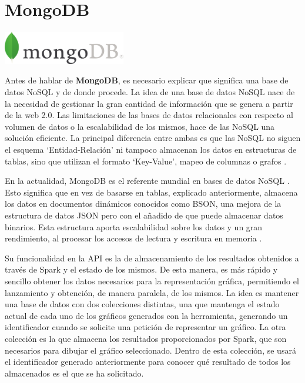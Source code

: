 \section{MongoDB}
\begin{minipage}{\textwidth}
	\centering
	\includegraphics[width=0.4\textwidth]{imagenes/mongoDB_logo.png}\\[0.1cm]
\end{minipage}

Antes de hablar de \textbf{MongoDB}, es necesario explicar que significa una base de datos NoSQL y de donde procede. La idea de una base de datos NoSQL nace de la necesidad de gestionar la gran cantidad de información que se genera a partir de la web 2.0. Las limitaciones de las bases de datos relacionales con respecto al volumen de datos o la escalabilidad de los mismos, hace de las NoSQL una solución eficiente.
La principal diferencia entre ambas es que las NoSQL no siguen el esquema ‘Entidad-Relación’ ni tampoco almacenan los datos en estructuras de tablas, sino que utilizan el formato ‘Key-Value’, mapeo de columnas o grafos \cite{MongoDBNoSQL}. 

En la actualidad, MongoDB es el referente mundial en bases de datos NoSQL \cite{MongoDBRanking}. Esto significa que en vez de basarse en tablas, explicado anteriormente, almacena los datos en documentos dinámicos conocidos como BSON, una mejora de la estructura de datos JSON pero con el añadido de que puede almacenar datos binarios. Esta estructura aporta escalabilidad sobre los datos y un gran rendimiento, al procesar los accesos de lectura y escritura en memoria \cite{MongoInicial}.

Su funcionalidad en la API es la de almacenamiento de los resultados obtenidos a través de Spark y el estado de los mismos. De esta manera, es más rápido y sencillo obtener los datos necesarios para la representación gráfica, permitiendo el lanzamiento y obtención, de manera paralela, de los mismos. 
La idea es mantener una base de datos con dos colecciones distintas, una que mantenga el estado actual de cada uno de los gráficos generados con la herramienta, generando un identificador cuando se solicite una petición de representar un gráfico. La otra colección es la que almacena los resultados proporcionados por Spark, que son necesarios para dibujar el gráfico seleccionado. Dentro de esta colección, se usará el identificador generado anteriormente para conocer qué resultado de todos los almacenados es el que se ha solicitado.

